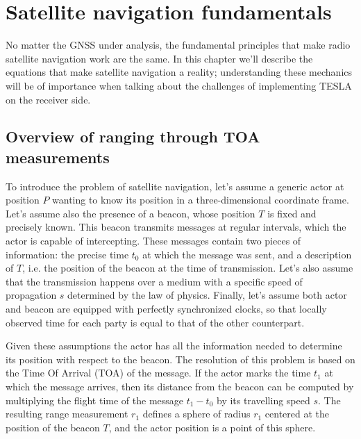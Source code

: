
\chapter{Satellite navigation fundamentals}
\label{ch:primer}

No matter the GNSS under analysis, the fundamental principles that make radio
satellite navigation work are the same. In this chapter we'll describe the
equations that make satellite navigation a reality; understanding these
mechanics will be of importance when talking about the challenges of
implementing TESLA on the receiver side.

\section{Overview of ranging through TOA measurements}
To introduce the problem of satellite navigation, let's assume a generic actor
at position $P$ wanting to know its position in a three-dimensional coordinate
frame. Let's assume also the presence of a beacon, whose position $T$ is fixed
and precisely known. This beacon transmits messages at regular intervals, which
the actor is capable of intercepting. These messages contain two pieces of
information: the precise time $t_0$ at which the message was sent, and a
description of $T$, i.e. the position of the beacon at the time of transmission.
Let's also assume that the transmission happens over a medium with a specific
speed of propagation $s$ determined by the law of physics. Finally, let's assume
both actor and beacon are equipped with perfectly synchronized clocks, so that
locally observed time for each party is equal to that of the other counterpart.

Given these assumptions the actor has all the information needed to determine
its position with respect to the beacon. The resolution of this problem is based
on the Time Of Arrival (TOA) of the message. If the actor marks the time $t_1$
at which the message arrives, then its distance from the beacon can be computed
by multiplying the flight time of the message $t_1 - t_0$ by its travelling
speed $s$. The resulting range measurement $r_1$ defines a sphere of radius
$r_1$ centered at the position of the beacon $T$, and the actor position is a
point of this sphere.

